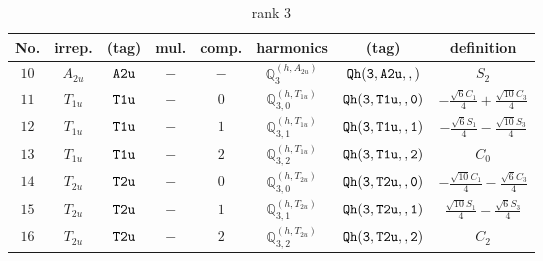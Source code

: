 \documentclass[fleqn,8pt]{jsarticle}
\begin{document}
\begin{table}[ht!]
\begin{center}
\caption{rank 3}
\renewcommand{\arraystretch}{1.3}
\begin{tabular}{cccccccc} \hline \hline
No. & irrep. & (tag) & mul. & comp. & harmonics & (tag) & definition \\ \hline
$ 10 $ & $ A_{2u} $ & $ {\tt A2u} $ & $ - $ & $ - $ & $ \mathbb{Q}_{3}^{(h,A_{2u})} $ & $ {\tt Qh(3,A2u,,)} $ & $ S_{2} $ \\
$ 11 $ & $ T_{1u} $ & $ {\tt T1u} $ & $ - $ & $ 0 $ & $ \mathbb{Q}_{3,0}^{(h,T_{1u})} $ & $ {\tt Qh(3,T1u,,0)} $ & $ - \frac{\sqrt{6} C_{1}}{4} + \frac{\sqrt{10} C_{3}}{4} $ \\
$ 12 $ & $ T_{1u} $ & $ {\tt T1u} $ & $ - $ & $ 1 $ & $ \mathbb{Q}_{3,1}^{(h,T_{1u})} $ & $ {\tt Qh(3,T1u,,1)} $ & $ - \frac{\sqrt{6} S_{1}}{4} - \frac{\sqrt{10} S_{3}}{4} $ \\
$ 13 $ & $ T_{1u} $ & $ {\tt T1u} $ & $ - $ & $ 2 $ & $ \mathbb{Q}_{3,2}^{(h,T_{1u})} $ & $ {\tt Qh(3,T1u,,2)} $ & $ C_{0} $ \\
$ 14 $ & $ T_{2u} $ & $ {\tt T2u} $ & $ - $ & $ 0 $ & $ \mathbb{Q}_{3,0}^{(h,T_{2u})} $ & $ {\tt Qh(3,T2u,,0)} $ & $ - \frac{\sqrt{10} C_{1}}{4} - \frac{\sqrt{6} C_{3}}{4} $ \\
$ 15 $ & $ T_{2u} $ & $ {\tt T2u} $ & $ - $ & $ 1 $ & $ \mathbb{Q}_{3,1}^{(h,T_{2u})} $ & $ {\tt Qh(3,T2u,,1)} $ & $ \frac{\sqrt{10} S_{1}}{4} - \frac{\sqrt{6} S_{3}}{4} $ \\
$ 16 $ & $ T_{2u} $ & $ {\tt T2u} $ & $ - $ & $ 2 $ & $ \mathbb{Q}_{3,2}^{(h,T_{2u})} $ & $ {\tt Qh(3,T2u,,2)} $ & $ C_{2} $ \\
 \hline \hline
\end{tabular}
\end{center}
\end{table}
\end{document}
